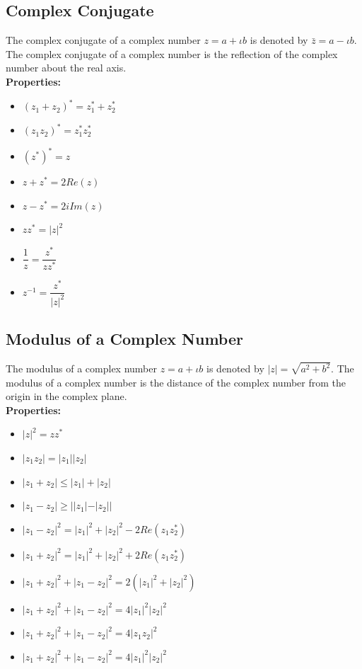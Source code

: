 \subsection{Complex Conjugate}
The complex conjugate of a complex number $z=a+\iota b$ is denoted by $\bar{z}=a-\iota b$. The complex conjugate of a complex number is the reflection of the complex number about the real axis.\\
\textbf{Properties: }
\begin{itemize}
    \item ${(z_1+z_2)^*}=z_1^*+z_2^*$
    \item ${(z_1z_2)^*}=z_1^*z_2^*$
    \item ${(z^*)^*}=z$
    \item $z+z^*=2Re(z)$
    \item $z-z^*=2iIm(z)$
    \item $zz^*=|z|^2$
    \item $\dfrac{1}{z}=\dfrac{{z^*}}{zz^*}$
    \item $z^{-1}=\dfrac{{z^*}}{|z|^2}$
\end{itemize}

\subsection{Modulus of a Complex Number}
The modulus of a complex number $z=a+\iota b$ is denoted by $|z|=\sqrt{a^2+b^2}$. The modulus of a complex number is the distance of the complex number from the origin in the complex plane.\\
\textbf{Properties: }
\begin{itemize}
    \item $|z|^2=zz^*$
    \item $|z_1z_2|=|z_1||z_2|$
    \item $|z_1+z_2|\leq |z_1|+|z_2|$
    \item $|z_1-z_2|\geq ||z_1|-|z_2||$
    \item $|z_1-z_2|^2=|z_1|^2+|z_2|^2-2Re(z_1z_2^*)$
    \item $|z_1+z_2|^2=|z_1|^2+|z_2|^2+2Re(z_1z_2^*)$
    \item $|z_1+z_2|^2+|z_1-z_2|^2=2(|z_1|^2+|z_2|^2)$
    \item $|z_1+z_2|^2+|z_1-z_2|^2=4|z_1|^2|z_2|^2$
    \item $|z_1+z_2|^2+|z_1-z_2|^2=4|z_1z_2|^2$
    \item $|z_1+z_2|^2+|z_1-z_2|^2=4|z_1|^2|z_2|^2$
\end{itemize}

